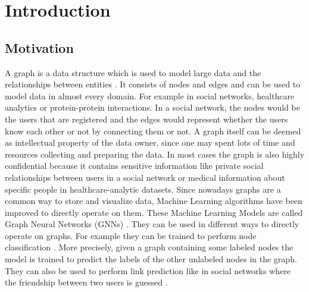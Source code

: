 \chapter{Introduction}


	\section{Motivation}
		A graph is a data structure which is used to model large data and the relationships between entities \cite{DBLP:journals/corr/abs-2005-00687, cook2006mining}.
		It consists of nodes and edges and can be used to model data in almost every domain.
		For example in social networks, healthcare analytics or protein-protein interactions.
		In a social network, the nodes would be the users that are registered and the edges would represent whether the users know each other or not by connecting them or not.
		A graph itself can be deemed as intellectual property of the data owner, since one may spent lots of time and resources collecting and preparing the data.
		In most cases the graph is also highly confidential because it contains sensitive information like private social relationships between users in a social network or medical information about specific people in healthcare-analytic datasets.
		Since nowadays graphs are a common way to store and visualize data, Machine Learning algorithms have been improved to directly operate on them.
		These Machine Learning Models are called Graph Neural Networks (GNNs) \cite{atwood2016diffusionconvolutional, defferrard2017convolutional}.
		They can be used in different ways to directly operate on graphs.
		For example they can be trained to perform node classification \cite{kipf2017semisupervised}.
		More precisely, given a graph containing some labeled nodes the model is trained to predict the labels of the other unlabeled nodes in the graph.
		They can also be used to perform link prediction like in social networks where the friendship between two users is guessed \cite{zhang2018link}.

